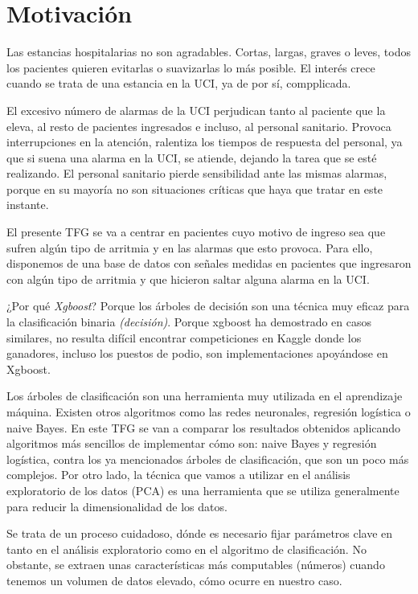 \section{Motivación}
	Las estancias hospitalarias no son agradables. Cortas, largas, graves o leves, todos los pacientes quieren evitarlas o suavizarlas lo más posible. El interés crece cuando se trata de una estancia en la UCI, ya de por sí, compplicada.\par 
\vspace*{0.5cm}
	El excesivo número de alarmas de la UCI perjudican tanto al paciente que la eleva, al resto de pacientes ingresados e incluso, al personal sanitario. Provoca interrupciones en la atención, ralentiza los tiempos de respuesta del personal, ya que si suena una alarma en la UCI, se atiende, dejando la tarea que se esté realizando. El personal sanitario pierde sensibilidad ante las mismas alarmas, porque en su mayoría no son situaciones críticas que haya que tratar en este instante.\cite{PhysionetIntro}\par 
\vspace*{0.5cm}
	El presente TFG se va a centrar en pacientes cuyo motivo de ingreso sea que sufren algún tipo de arritmia y en las alarmas que esto provoca. Para ello, disponemos de una base de datos con señales medidas en pacientes que ingresaron con algún tipo de arritmia y que hicieron saltar alguna alarma en la UCI.\par 
\vspace*{0.5cm}
	¿Por qué \textit{Xgboost}? Porque los árboles de decisión son una técnica muy eficaz para la clasificación binaria \textit{(decisión)}. Porque xgboost ha demostrado en casos similares, no resulta difícil encontrar competiciones en Kaggle\cite{Kaggle} donde los ganadores, incluso los puestos de podio, son implementaciones apoyándose en Xgboost.\par 
\vspace*{0.5cm}
	Los árboles de clasificación son una herramienta muy utilizada en el aprendizaje máquina. Existen otros algoritmos como las redes neuronales, regresión logística o naive Bayes. En este TFG se van a comparar los resultados obtenidos aplicando algoritmos más sencillos de implementar cómo son: naive Bayes y regresión logística, contra los ya mencionados árboles de clasificación, que son un poco más complejos. Por otro lado, la técnica que vamos a utilizar en el análisis exploratorio de los datos (PCA) es una herramienta que se utiliza generalmente para reducir la dimensionalidad de los datos.\cite{PCAWiki}\par 
\vspace*{0.5cm}
	Se trata de un proceso cuidadoso, dónde es necesario fijar parámetros clave en tanto en el análisis exploratorio como en el algoritmo de clasificación. No obstante, se extraen unas características más computables (números) cuando tenemos un volumen de datos elevado, cómo ocurre en nuestro caso.\par 
	
